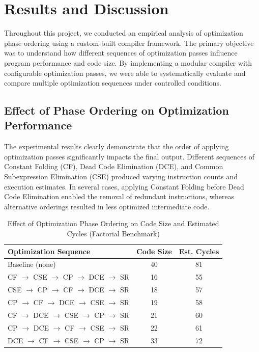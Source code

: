 \documentclass[conference]{IEEEtran}
\begin{document}
\section{Results and Discussion}
Throughout this project, we conducted an empirical analysis of optimization phase ordering using a custom-built compiler framework. The primary objective was to understand how different sequences of optimization passes influence program performance and code size. By implementing a modular compiler with configurable optimization passes, we were able to systematically evaluate and compare multiple optimization sequences under controlled conditions.

\subsection{Effect of Phase Ordering on Optimization Performance}
The experimental results clearly demonstrate that the order of applying optimization passes significantly impacts the final output. Different sequences of Constant Folding (CF), Dead Code Elimination (DCE), and Common Subexpression Elimination (CSE) produced varying instruction counts and execution estimates. In several cases, applying Constant Folding before Dead Code Elimination enabled the removal of redundant instructions, whereas alternative orderings resulted in less optimized intermediate code.
\begin{table}[!htbp]
\centering
\caption{Effect of Optimization Phase Ordering on Code Size and Estimated Cycles (Factorial Benchmark)}
\label{tab:phase_order_tradeoff}
\renewcommand{\arraystretch}{1.2}
{\small
\begin{tabularx}{\columnwidth}{@{}Xcc@{}}
\toprule
\textbf{Optimization Sequence} & \textbf{Code Size} & \textbf{Est. Cycles} \\
\midrule
Baseline (none) & 40 & 81 \\
CF $\to$ CSE $\to$ CP $\to$ DCE $\to$ SR & 16 & 55 \\
CSE $\to$ CP $\to$ CF $\to$ DCE $\to$ SR & 18 & 57 \\
CP $\to$ CF $\to$ DCE $\to$ CSE $\to$ SR & 19 & 58 \\
CF $\to$ DCE $\to$ CSE $\to$ CP $\to$ SR & 21 & 60 \\
CP $\to$ DCE $\to$ CF $\to$ CSE $\to$ SR & 22 & 61 \\
DCE $\to$ CF $\to$ CSE $\to$ CP $\to$ SR & 33 & 72 \\
\bottomrule
\end{tabularx}
}
\end{table}
\end{document}
